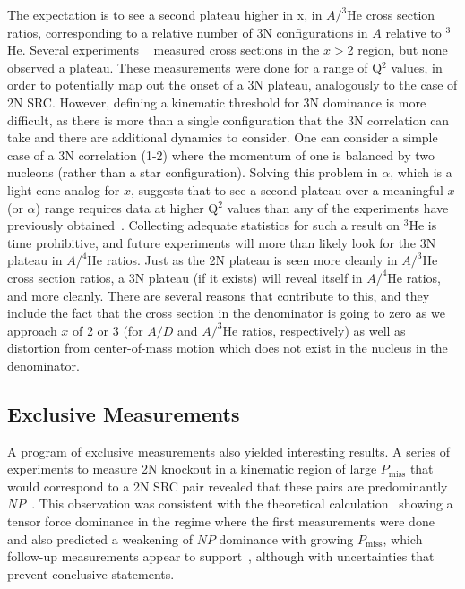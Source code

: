 The expectation is to see a second plateau higher in x, in $A/^3\mathrm{He}$ cross section ratios, corresponding to a relative number of 3N configurations in $A$ relative to $^3$He.  Several experiments ~\cite{egiyan2006, fomin2012, Ye2017}  measured cross sections in the $x>$2 region, but none observed a plateau.  These measurements were done for a range of Q$^2$ values, in order to potentially map out the onset of a 3N plateau, analogously to the case of 2N SRC.  However, defining a kinematic threshold for 3N dominance is more difficult, as there is more than a single configuration that the 3N correlation can take and there are additional dynamics to consider.  One can consider a simple case of a 3N correlation (1-2) where the momentum of one is balanced by two nucleons (rather than a star configuration).  Solving this problem in $\alpha$, which is a light cone analog for $x$, suggests that to see a second plateau over a meaningful $x$ (or $\alpha$) range requires data at higher Q$^2$ values than any of the experiments have previously obtained~\cite{fomin17}.  Collecting adequate statistics for such a result on $^3$He is time prohibitive, and future experiments will more than likely look for the 3N plateau in $A/^4\mathrm{He}$ ratios.  Just as the 2N plateau is seen more cleanly in $A/^3\mathrm{He}$ cross section ratios, a 3N plateau (if it exists) will reveal itself in  $A/^4\mathrm{He}$ ratios, and more cleanly.  There are several reasons that contribute to this, and they include the fact that the cross section in the denominator is going to zero as we approach $x$ of 2 or 3 (for $A/D$ and $A/^3\mathrm{He}$ ratios, respectively) as well as distortion from center-of-mass motion which does not exist in the nucleus in the denominator. 

\subsection{Exclusive Measurements}
A program of exclusive measurements also yielded interesting results. A series of experiments to measure 2N knockout in a kinematic region of large $P_\mathrm{miss}$ that would correspond to a 2N SRC pair revealed that these pairs are predominantly $NP$~\cite{Subedi:2008zz, Shneor:2007tu}.  This observation was consistent with the theoretical calculation~\cite{Schiavilla:2006xx} showing a tensor force dominance in the regime where the first measurements were done and also predicted a weakening of $NP$ dominance with growing $P_\mathrm{miss}$, which follow-up measurements appear to support~\cite{korover2014}, although with uncertainties that prevent conclusive statements. 


